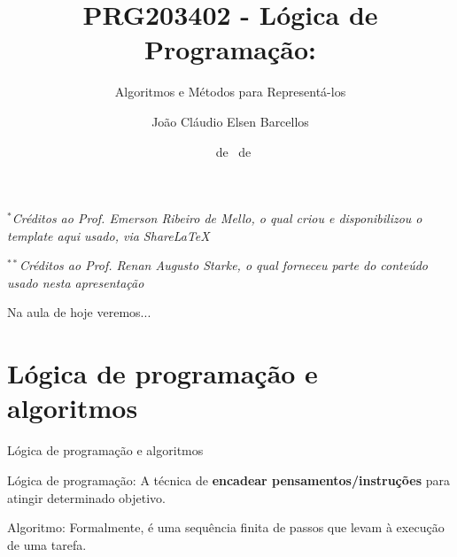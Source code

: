 \documentclass{beamer}
\title{PRG203402 - Lógica de Programação:}
\subtitle{\LARGE Algoritmos e Métodos para Representá-los}
\author{João Cláudio Elsen Barcellos}
\date{\scriptsize \DAY~de \MONTH~de \YEAR}
\institute{
    Engenheiro Eletricista\\
    Formado na Universidade Federal de Santa Catarina\\
    campus Florianópolis\\
    \url{joaoclaudiobarcellos@gmail.com}
}
\begin{document}
\captionsetup{labelformat=empty}

\begin{frame}[t]
    \maketitle
    \vspace{-1cm}
    \begin{flushleft}
        \vfill
        \textit{\tiny $^{*}$Créditos ao Prof. Emerson Ribeiro de Mello, o qual criou e disponibilizou o template aqui usado, via ShareLaTeX}\par
        \textit{\tiny $^{**}$Créditos ao Prof. Renan Augusto Starke, o qual forneceu parte do conteúdo usado nesta apresentação}
    \end{flushleft}
\end{frame}

\begin{frame}[t]{Na aula de hoje veremos...}
    \tableofcontents
\end{frame}

\section{Lógica de programação e algoritmos}
\begin{frame}{Lógica de programação e algoritmos}
    \begin{alertblock}{Lógica de programação:}
        A técnica de \textbf{encadear pensamentos/instruções} para atingir determinado objetivo.
    \end{alertblock}   
    \begin{alertblock}{Algoritmo:}
        Formalmente, é uma sequência finita de passos que levam à execução de uma tarefa. 
    \end{alertblock}
\end{frame}
\end{document}
